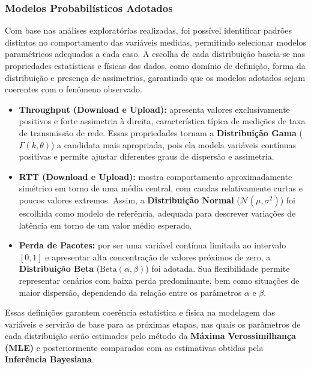 \documentclass{article}
\begin{document}
\subsubsection{Modelos Probabilísticos Adotados}

Com base nas análises exploratórias realizadas, foi possível identificar padrões distintos
no comportamento das variáveis medidas, permitindo selecionar modelos paramétricos
adequados a cada caso. A escolha de cada distribuição baseia-se nas propriedades
estatísticas e físicas dos dados, como domínio de definição, forma da distribuição e
presença de assimetrias, garantindo que os modelos adotados sejam coerentes com o
fenômeno observado.

\begin{itemize}
	\item \textbf{Throughput (Download e Upload):}
	apresenta valores exclusivamente positivos e forte assimetria à direita,
	característica típica de medições de taxa de transmissão de rede.
	Essas propriedades tornam a \textbf{Distribuição Gama} ($\Gamma(k,\theta)$)
	a candidata mais apropriada, pois ela modela variáveis contínuas positivas
	e permite ajustar diferentes graus de dispersão e assimetria.
	
	\item \textbf{RTT (Download e Upload):}
	mostra comportamento aproximadamente simétrico em torno de uma média central,
	com caudas relativamente curtas e poucos valores extremos.
	Assim, a \textbf{Distribuição Normal} ($\mathcal{N}(\mu,\sigma^2)$)
	foi escolhida como modelo de referência, adequada para descrever variações
	de latência em torno de um valor médio esperado.
	
	\item \textbf{Perda de Pacotes:}
	por ser uma variável contínua limitada ao intervalo $[0,1]$ e apresentar
	alta concentração de valores próximos de zero, a \textbf{Distribuição Beta}
	($\mathrm{Beta}(\alpha,\beta)$) foi adotada.
	Sua flexibilidade permite representar cenários com baixa perda predominante,
	bem como situações de maior dispersão, dependendo da relação entre os parâmetros
	$\alpha$ e $\beta$.
\end{itemize}

Essas definições garantem coerência estatística e física na modelagem das variáveis
e servirão de base para as próximas etapas, nas quais os parâmetros de cada distribuição
serão estimados pelo método da \textbf{Máxima Verossimilhança (MLE)} e posteriormente
comparados com as estimativas obtidas pela \textbf{Inferência Bayesiana}.
\end{document}

